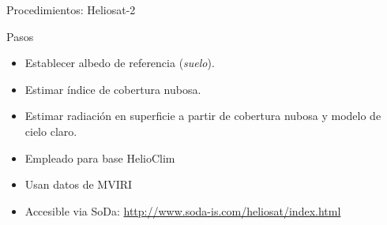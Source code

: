 \documentclass[xcolor={usenames,svgnames,dvipsnames}]{beamer}
\begin{document}
\begin{frame}[label={sec:org5107571}]{Procedimientos: Heliosat-2}
\begin{block}{Pasos}
\begin{itemize}
\item Establecer \alert{albedo de referencia} (\emph{suelo}).
\item Estimar \alert{índice de cobertura nubosa}.
\item Estimar radiación en superficie a partir de cobertura nubosa y \alert{modelo de cielo claro}.
\end{itemize}
\end{block}

\begin{block}{}
\begin{itemize}
\item Empleado para base HelioClim
\item Usan datos de MVIRI
\item Accesible via SoDa: \url{http://www.soda-is.com/heliosat/index.html}
\end{itemize}

\nocite{Rigollier.Lefevre.ea2004}
\end{block}
\end{frame}
\end{document}
